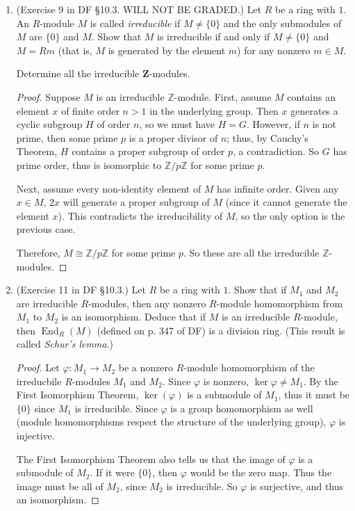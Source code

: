 \documentclass[10pt]{article}
\newcommand{\Z}{\mathbb{Z}}
\DeclareMathOperator*{\End}{End}
\begin{document}
\begin{enumerate}
\item (Exercise 9 in DF \S 10.3.  WILL NOT BE GRADED.) Let $R$ be a ring with $1$.  An $R$-module $M$ is called \emph{irreducible} if $M \neq \{0\}$ and the only submodules of $M$ are $\{0\}$ and $M$.  Show that $M$ is irreducible if and only if $M \neq \{0\}$ and $M = Rm$ (that is, $M$ is generated by the element $m$) for any nonzero $m \in M$.

Determine all the irreducible $\mathbf{Z}$-modules.

\begin{proof}
Suppose $M$ is an irreducible $\Z$-module.  First, assume $M$ contains an element $x$ of finite order $n > 1$ in the underlying group.  Then $x$ generates a cyclic subgroup $H$ of order $n$, so we must have $H = G$.  However, if $n$ is not prime, then some prime $p$ is a proper divisor of $n$; thus, by Cauchy's Theorem, $H$ contains a proper subgroup of order $p$, a contradiction.  So $G$ has prime order, thus is isomorphic to $\Z / p\Z$ for some prime $p$.

Next, assume every non-identity element of $M$ has infinite order.  Given any $x \in M$, $2x$ will generate a proper subgroup of $M$ (since it cannot generate the element $x$).  This contradicts the irreducibility of $M$, so the only option is the previous case.

Therefore, $M \cong \Z / p\Z$ for some prime $p$.  So these are all the irreducible $\Z$-modules.
\end{proof}

\item (Exercise 11 in DF \S 10.3.) Let $R$ be a ring with $1$.  Show that if $M_1$ and $M_2$ are irreducible $R$-modules, then any nonzero $R$-module homomorphism from $M_1$ to $M_2$ is an isomorphism.  Deduce that if $M$ is an irreducible $R$-module, then $\End_R(M)$ (defined on p. 347 of DF) is a division ring.  (This result is called \emph{Schur's lemma}.)

\begin{proof}
Let $\varphi: M_1 \rightarrow M_2$ be a nonzero $R$-module homomorphism of the irreducbile $R$-modules $M_1$ and $M_2$.  Since $\varphi$ is nonzero, $\ker \varphi \neq M_1$.  By the First Isomorphism Theorem, $\ker (\varphi)$ is a submodule of $M_1$, thus it must be $\{0\}$ since $M_1$ is irreducible.  Since $\varphi$ is a group homomorphism as well (module homomorphisms respect the structure of the underlying group), $\varphi$ is injective.

The First Isomorphism Theorem also tells us that the image of $\varphi$ is a submodule of $M_2$.  If it were $\{0\}$, then $\varphi$ would be the zero map.  Thus the image must be all of $M_2$, since $M_2$ is irreducible.  So $\varphi$ is surjective, and thus an isomorphism.


\end{proof}
\end{enumerate}
\end{document}
